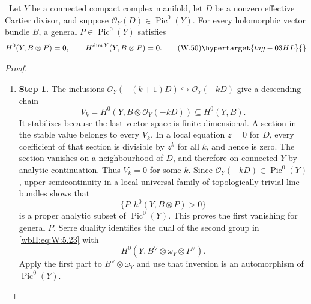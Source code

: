 \begin{lemma}\hypertarget{tag-03I7}{}\label{wbII:lem:cdp-generic-endpoints}

\ Let \(Y\) be a connected compact complex manifold, let \(D\) be
a nonzero effective Cartier divisor, and suppose
\(\mathcal O_Y(D)\in\operatorname{Pic}^0(Y)\).  For every holomorphic vector
bundle \(B\), a general \(P\in\operatorname{Pic}^0(Y)\) satisfies
\[
 H^0(Y,B\otimes P)=0,\qquad
 H^{\dim Y}(Y,B\otimes P)=0.
\tag{W.50}\hypertarget{tag-03HL}{}\label{wbII:eq:W:5.23}
\]
\end{lemma}



\begin{proof}
\begin{enumerate}[label={$\langle1\rangle$\arabic*.},leftmargin=*]
\item 
\noindent\textbf{Step 1.} The inclusions \(\mathcal O_Y(-(k+1)D)\hookrightarrow
\mathcal O_Y(-kD)\) give a descending chain
\[
 V_k=H^0(Y,B\otimes\mathcal O_Y(-kD))
 \subseteq H^0(Y,B).
\]
It stabilizes because the last vector space is finite-dimensional.  A
section in the stable value belongs to every \(V_k\).  In a local equation
\(z=0\) for \(D\), every coefficient of that section is divisible by
\(z^k\) for all \(k\), and hence is zero.  The section vanishes on a
neighbourhood of \(D\), and therefore on connected \(Y\) by analytic
continuation.  Thus \(V_k=0\) for some \(k\).  Since
\(\mathcal O_Y(-kD)\in\operatorname{Pic}^0(Y)\), upper semicontinuity in a
local universal family of topologically trivial line bundles shows that
\[
 \{P:h^0(Y,B\otimes P)>0\}
\]
is a proper analytic subset of \(\operatorname{Pic}^0(Y)\).  This proves
the first vanishing for general \(P\).  Serre duality identifies the dual
of the second group in \eqref{wbII:eq:W:5.23} with
\[
 H^0(Y,B^\vee\otimes\omega_Y\otimes P^\vee).
\]
Apply the first part to \(B^\vee\otimes\omega_Y\) and use that inversion is
an automorphism of \(\operatorname{Pic}^0(Y)\).

\end{enumerate}
\end{proof}